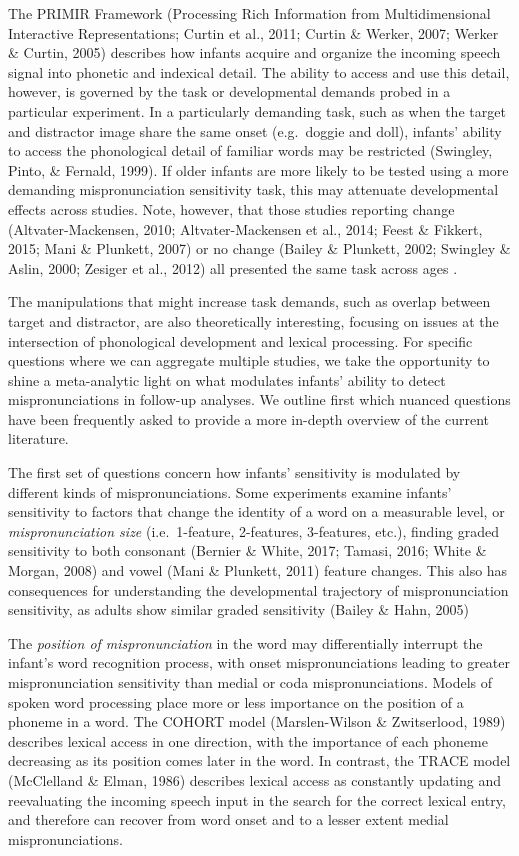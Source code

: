 \documentclass[man]{apa6}
\begin{document}
The PRIMIR Framework (Processing Rich Information from Multidimensional Interactive Representations; Curtin et al., 2011; Curtin \& Werker, 2007; Werker \& Curtin, 2005) describes how infants acquire and organize the incoming speech signal into phonetic and indexical detail. The ability to access and use this detail, however, is governed by the task or developmental demands probed in a particular experiment. In a particularly demanding task, such as when the target and distractor image share the same onset (e.g.~doggie and doll), infants' ability to access the phonological detail of familiar words may be restricted (Swingley, Pinto, \& Fernald, 1999). If older infants are more likely to be tested using a more demanding mispronunciation sensitivity task, this may attenuate developmental effects across studies. Note, however, that those studies reporting change (Altvater-Mackensen, 2010; Altvater-Mackensen et al., 2014; Feest \& Fikkert, 2015; Mani \& Plunkett, 2007) or no change (Bailey \& Plunkett, 2002; Swingley \& Aslin, 2000; Zesiger et al., 2012) all presented the same task across ages .

The manipulations that might increase task demands, such as overlap between target and distractor, are also theoretically interesting, focusing on issues at the intersection of phonological development and lexical processing. For specific questions where we can aggregate multiple studies, we take the opportunity to shine a meta-analytic light on what modulates infants' ability to detect mispronunciations in follow-up analyses. We outline first which nuanced questions have been frequently asked to provide a more in-depth overview of the current literature.

The first set of questions concern how infants' sensitivity is modulated by different kinds of mispronunciations. Some experiments examine infants' sensitivity to factors that change the identity of a word on a measurable level, or \emph{mispronunciation size} (i.e.~1-feature, 2-features, 3-features, etc.), finding graded sensitivity to both consonant (Bernier \& White, 2017; Tamasi, 2016; White \& Morgan, 2008) and vowel (Mani \& Plunkett, 2011) feature changes. This also has consequences for understanding the developmental trajectory of mispronunciation sensitivity, as adults show similar graded sensitivity (Bailey \& Hahn, 2005)

The \emph{position of mispronunciation} in the word may differentially interrupt the infant's word recognition process, with onset mispronunciations leading to greater mispronunciation sensitivity than medial or coda mispronunciations. Models of spoken word processing place more or less importance on the position of a phoneme in a word. The COHORT model (Marslen-Wilson \& Zwitserlood, 1989) describes lexical access in one direction, with the importance of each phoneme decreasing as its position comes later in the word. In contrast, the TRACE model (McClelland \& Elman, 1986) describes lexical access as constantly updating and reevaluating the incoming speech input in the search for the correct lexical entry, and therefore can recover from word onset and to a lesser extent medial mispronunciations.
\end{document}
